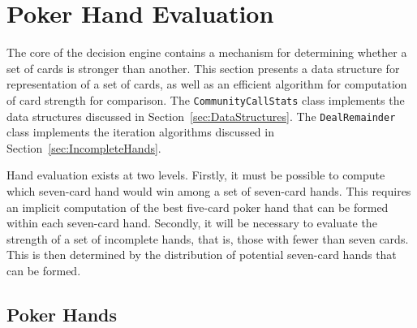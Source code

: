 
\newcommand{\xs}{$\spadesuit$}
\newcommand{\xh}{$\heartsuit$}
\newcommand{\xc}{$\clubsuit$}
\newcommand{\xd}{$\diamondsuit$}



\chapter{Poker Hand Evaluation}
\label{sec:HandEvaluation}

The core of the decision engine contains a mechanism for determining whether a set of cards is stronger than another.
This section presents a data structure for representation of a set of cards, as well as an efficient algorithm for computation of card strength for comparison.
The \texttt{CommunityCallStats} class implements the data structures discussed in Section~\ref{sec:DataStructures}.
The \texttt{DealRemainder} class implements the iteration algorithms discussed in Section~\ref{sec:IncompleteHands}.





Hand evaluation exists at two levels.
Firstly, it must be possible to compute which seven-card hand would win among a set of seven-card hands.
This requires an implicit computation of the best five-card poker hand that can be formed within each seven-card hand.
Secondly, it will be necessary to evaluate the strength of a set of incomplete hands, that is, those with fewer than seven cards.
This is then determined by the distribution of potential seven-card hands that can be formed.


\section{Poker Hands}
\label{sec:PokerHands}



